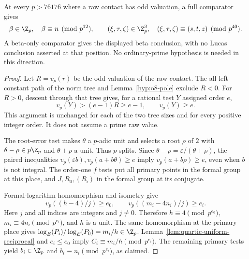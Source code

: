 \begin{lemma}
\label{lem:quartic-selective-local}
At every $p>76176$ where a raw contact has odd valuation, a full
comparator gives
\[
 \beta\in\Z_p,\quad \beta\equiv n\pmod {p^{12}},\qquad
 (\xi,\tau,\zeta)\in\Z_p^3,\quad
 (\xi,\tau,\zeta)\equiv(s,t,z)\pmod {p^{40}}.
\]
A beta-only comparator gives the displayed beta conclusion, with no
Lucas conclusion asserted at that position.
No ordinary-prime hypothesis is needed in this direction.
\end{lemma}
\begin{proof}
Let $R=v_p(r)$ be the odd valuation of the raw contact. The all-left
constant path of the norm tree and Lemma~\ref{hyp:o8-pole} exclude
$R<0$. For $R>0$, descent through that tree gives, for a rational test
$Y$ assigned order $e$,
\[
 v_p(Y)>(e-1)R\ge e-1,\qquad v_p(Y)\ge e.
\]
This argument is unchanged for each of the two tree sizes and for
every positive integer order. It does not assume a prime raw value.

The root-error test makes $\theta$ a $p$-adic unit and selects a root
$\rho$ of $2$ with $\theta-\rho\in p\Z_p$ and $\theta+\rho$ a unit.
Thus $p$ splits. Since
$\theta-\rho=\varepsilon/(\theta+\rho)$, the paired inequalities
$v_p(\varepsilon b),v_p(a+b\theta)\ge e$ imply
$v_p(a+b\rho)\ge e$, even when $b$ is not integral.
The order-one $f$ tests put all primary points in the formal group at
this place, and $J,R_0,(R_i)$ in the formal group at its conjugate.

Formal-logarithm homomorphism and isometry
\cite[IV.6.4 and VII.2.1--2.2]{silverman} give
\[
 v_p((h-4)/j)\ge e_0,\qquad
 v_p((m_i-4n_i)/j)\ge e_i.
\]
Here $j$ and all indices are integers and $j\ne0$. Therefore
$h\equiv4\pmod {p^{e_0}}$, $m_i\equiv4n_i\pmod {p^{e_i}}$,
and $h$ is a unit. The same homomorphism at the primary place gives
$\log_E(P_i)/\log_E(P_0)=m_i/h\in\Z_p$.
Lemma~\ref{lem:quartic-uniform-reciprocal} and $e_i\le e_0$ imply
$C_i\equiv m_i/h\pmod {p^{e_i}}$. The remaining primary tests yield
$b_i\in\Z_p$ and $b_i\equiv n_i\pmod {p^{e_i}}$, as claimed.
\end{proof}

